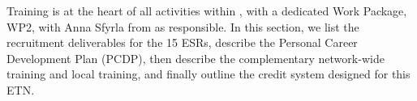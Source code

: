 Training is at the heart of all activities within \acronym,
with a dedicated Work Package, WP2, with Anna Sfyrla from \unigeentity as responsible. 
In this section, we list the recruitment deliverables for the 15 ESRs, 
describe the Personal Career Development Plan (PCDP),
then describe the complementary network-wide training and local training, 
and finally outline the \acronym credit system designed for this ETN. 

